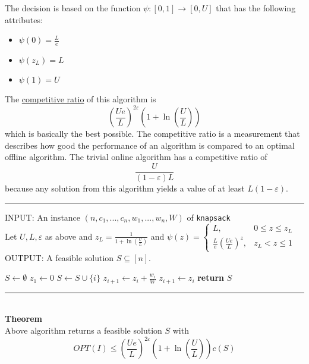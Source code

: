 \documentclass[a4paper, 12pt]{article}
\begin{document}
	The decision is based on the function $\psi: [0,1] \to [0,U]$ that has the following attributes: \begin{itemize}
		\item $\psi(0) = \frac{L}{e}$
		\item $\psi(z_L) = L$
		\item $\psi(1) = U$
	\end{itemize}  
	The \underline{competitive ratio} of this algorithm is \[\left(\frac{Ue}{L}\right)^{2\varepsilon}\left(1+\ln\left(\frac{U}{L}\right)\right)\]
	which is basically the best possible. The competitive ratio is a measurement that describes how good the performance of an algorithm is compared to an optimal offline algorithm. The trivial online algorithm has a competitive ratio of \[\frac{U}{(1-\varepsilon)L}\] because any solution from this algorithm yields a value of at least $L(1-\varepsilon)$.
	\par\noindent\rule{\textwidth}{0.4pt}
	INPUT: An instance $(n,c_1,...,c_n, w_1,...,w_n,W)$ of \texttt{knapsack}\\
	Let $U,L,\varepsilon$ as above and $z_L = \frac{1}{1+\ln (\frac{U}{L})}$ and $\psi(z) = \begin{cases}
		L, & 0\leq z \leq z_L\\
		\frac{L}{e}(\frac{Ue}{L})^z, & z_L < z \leq 1
	\end{cases}$\\
	OUTPUT: A feasible solution $S \subseteq [n]$.
	\begin{algorithmic}[1]
		\State $S \gets \emptyset$
		\State $z_1 \gets 0$
		\State $S \gets S \cup \{i\}$
		\State $z_{i+1} \gets z_i + \frac{w_i}{W}$
		\Else
		\State $z_{i+1} \gets z_i$
		\EndIf
		\EndFor
		\State \textbf{return} $S$
	\end{algorithmic}
	\par\noindent\rule{\textwidth}{0.4pt}\\
	\textbf{Theorem}\\
	Above algorithm returns a feasible solution $S$ with \[OPT(I) \leq \left(\frac{Ue}{L}\right)^{2\varepsilon}\left(1+\ln \left(\frac{U}{L}\right)\right)c(S)\]
\end{document}
